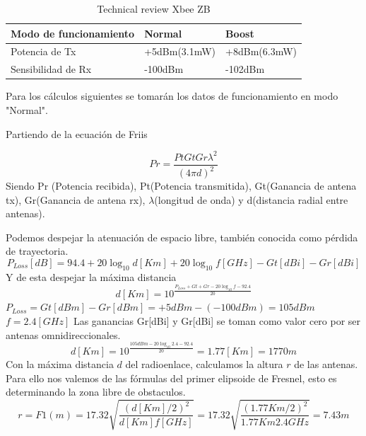 \documentclass[11pt,oneside,spanish,a4paper]{article}
\begin{document}
\begin{table}[h]
\centering
\begin{tabular}{l l l}
\hline
\textbf{Modo de funcionamiento} & \textbf{Normal} & \textbf{Boost}\\
\hline
Potencia de Tx & +5dBm(3.1mW) & +8dBm(6.3mW) \\
Sensibilidad de Rx & -100dBm & -102dBm\\
\hline
\end{tabular}
\caption{Technical review Xbee ZB}
\end{table}
Para los c\'alculos siguientes se tomar\'an los datos de funcionamiento en modo "Normal".

Partiendo de la ecuaci\'on de Friis




\begin{equation*}
\label{Ec:Friis}
Pr = \frac{Pt Gt Gr \lambda ^{2}}{(4\pi d)^2}
\end{equation*}
Siendo Pr (Potencia recibida), Pt(Potencia transmitida), Gt(Ganancia de antena tx), Gr(Ganancia de antena rx), $\lambda$(longitud de onda) y d(distancia radial entre antenas).

Podemos despejar la atenuaci\'on de espacio libre, tambi\'en conocida como p\'erdida de trayectoria.
\begin{equation*}
\label{Ec:perdida}
P_{Loss}[dB] = 94.4 + 20 \log_{10}d [Km] + 20 \log_{10}f [GHz] - Gt[dBi] - Gr[dBi]
\end{equation*}
	Y de esta despejar la m\'axima distancia
\begin{equation*}
\label{Ec:distancia}
d[Km] = 10^{\frac{P_{Loss} + Gt + Gr - 20 \log_{10}f - 92.4}{20}}
\end{equation*}
$P_{Loss}=Gt[dBm] - Gr[dBm] = +5dBm - (-100dBm) = 105dBm$
$f = 2.4 [GHz]$
Las ganancias Gr[dBi] y Gr[dBi] se toman como valor cero por ser antenas omnidireccionales.
\begin{equation*}
\label{Ec:distancia1}
d[Km] = 10^{\frac{105 dBm - 20 \log_{10}2.4 - 92.4}{20}} = 1.77 [Km] =1770m
\end{equation*}	
Con la m\'axima distancia $d$ del radioenlace, calculamos la altura $r$ de las antenas. Para ello nos valemos de las f\'ormulas del primer elipsoide de Fresnel, esto es determinando la zona libre de obstaculos.
\begin{equation*}
\label{Ec:fresnel}
r = F1(m) = 17.32 \sqrt{\frac{(d[Km]/2)^2}{d[Km]f[GHz]}} = 17.32 \sqrt{\frac{(1.77Km/2)^2}{1.77Km2.4GHz}} = 7.43m
\end{equation*}	
\end{document}
